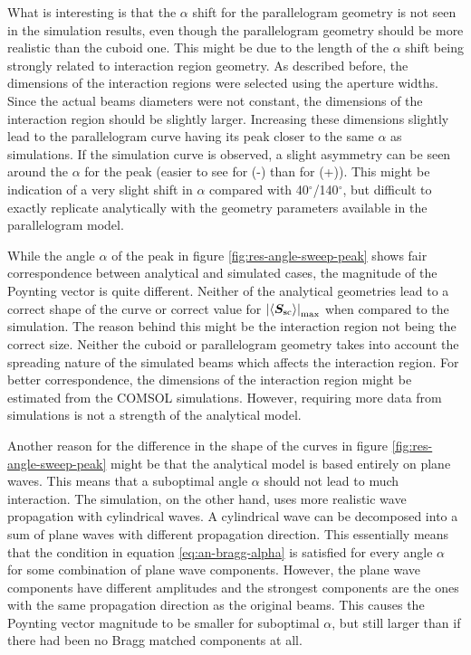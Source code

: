 \documentclass[11pt,twoside]{eitExjobb}
\begin{document}
	What is interesting is that the $\alpha$ shift for the parallelogram geometry is not seen in the simulation results, even though the parallelogram geometry should be more realistic than the cuboid one. This might be due to the length of the $\alpha$ shift being strongly related to interaction region geometry. As described before, the dimensions of the interaction regions were selected using the aperture widths. Since the actual beams diameters were not constant, the dimensions of the interaction region should be slightly larger. Increasing these dimensions slightly lead to the parallelogram curve having its peak closer to the same $\alpha$ as simulations. If the simulation curve is observed, a slight asymmetry can be seen around the $\alpha$ for the peak (easier to see for (-) than for (+)). This might be indication of a very slight shift in $\alpha$ compared with 40$^\circ$/140$^\circ$, but difficult to exactly replicate analytically with the geometry parameters available in the parallelogram model.
	
	While the angle $\alpha$ of the peak in figure \ref{fig:res-angle-sweep-peak} shows fair correspondence between analytical and simulated cases, the magnitude of the Poynting vector is quite different. Neither of the analytical geometries lead to a correct shape of the curve or correct value for $\left| \left< \bm{S}_{\mathrm{sc}} \right> \right|_{\mathrm{max}}$ when compared to the simulation. The reason behind this might be the interaction region not being the correct size. Neither the cuboid or parallelogram geometry takes into account the spreading nature of the simulated beams which affects the interaction region. For better correspondence, the dimensions of the interaction region might be estimated from the COMSOL simulations. However, requiring more data from simulations is not a strength of the analytical model.
	
	Another reason for the difference in the shape of the curves in figure \ref{fig:res-angle-sweep-peak} might be that the analytical model is based entirely on plane waves. This means that a suboptimal angle $\alpha$ should not lead to much interaction. The simulation, on the other hand, uses more realistic wave propagation with cylindrical waves. A cylindrical wave can be decomposed into a sum of plane waves with different propagation direction. This essentially means that the condition in equation \eqref{eq:an-bragg-alpha} is satisfied for every angle $\alpha$ for some combination of plane wave components. However, the plane wave components have different amplitudes and the strongest components are the ones with the same propagation direction as the original beams. This causes the Poynting vector magnitude to be smaller for suboptimal $\alpha$, but still larger than if there had been no Bragg matched components at all.
	
\end{document}
